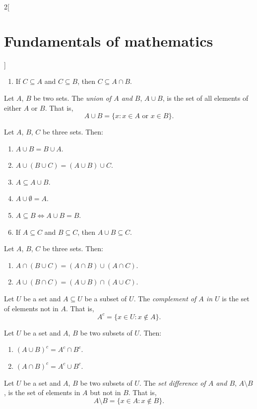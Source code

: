 \documentclass[../../../main.tex]{subfiles}
\begin{document}
\begin{multicols}{2}[\section{Fundamentals of mathematics}]
\begin{prop}
\begin{enumerate}
        \item If $C\subseteq A$ and $C\subseteq B$, then $C\subseteq A\cap B$.
    \end{enumerate}
\end{prop}
\begin{definition}
    Let $A$, $B$ be two sets. The \textit{union of $A$ and $B$}, $A\cup B$, is the set of all elements of either $A$ or $B$. That is, $$A\cup B=\{x:x\in A\text{ or }x\in B\}.$$
\end{definition}
\begin{prop}
    Let $A$, $B$, $C$ be three sets. Then:
    \begin{enumerate}
        \item $A\cup B=B\cup A$.
        \item $A\cup(B\cup C)=(A\cup B)\cup C$.
        \item $A\subseteq A\cup B$.
        \item $A\cup\emptyset=A$.
        \item $A\subseteq B\iff A\cup B=B$.
        \item If $A\subseteq C$ and $B\subseteq C$, then $A\cup B\subseteq C$.
    \end{enumerate}
\end{prop}
\begin{prop}
    Let $A$, $B$, $C$ be three sets. Then:
    \begin{enumerate}
        \item $A\cap (B\cup C)=(A\cap B)\cup (A\cap C)$.
        \item $A\cup (B\cap C)=(A\cup B)\cap (A\cup C)$.
    \end{enumerate}
\end{prop}
\begin{definition}
    Let $U$ be a set and $A\subseteq U$ be a subset of $U$. The \textit{complement of $A$ in $U$} is the set of elements not in $A$. That is, $$A^c=\{x\in U:x\notin A\}.$$
\end{definition}
\begin{prop}
    Let $U$ be a set and $A$, $B$ be two subsets of $U$. Then:
    \begin{enumerate}
        \item $(A\cup B)^c=A^c\cap B^c$.
        \item $(A\cap B)^c=A^c\cup B^c$.
    \end{enumerate}
\end{prop}
\begin{definition}
    Let $U$ be a set and $A$, $B$ be two subsets of $U$. The \textit{set difference of $A$ and $B$}, $A\setminus B$, is the set of elements in $A$ but not in $B$. That is, $$A\setminus B=\{x\in A:x\notin B\}.$$

\end{definition}
\end{multicols}
\end{document}
